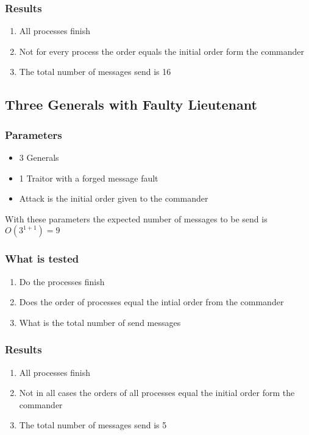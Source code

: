 \documentclass[a4paper, notitlepage]{article}
\begin{document}
\subsubsection*{Results}
\begin{enumerate}
\item All processes finish
\item Not for every process the order equals the initial order form the commander
\item The total number of messages send is 16
\end{enumerate}





\subsection{Three Generals with Faulty Lieutenant}

\subsubsection*{Parameters}
\begin{itemize}
\item 3 Generals
\item 1 Traitor with a forged message fault
\item Attack is the initial order given to the commander
\end{itemize}

With these parameters the expected number of messages to be send is \(O(3^{1+1}) = 9\)

\subsubsection*{What is tested}
\begin{enumerate}
\item Do the processes finish
\item Does the order of processes equal the intial order from the commander
\item What is the total number of send messages
\end{enumerate}

\subsubsection*{Results}
\begin{enumerate}
\item All processes finish
\item Not in all cases the orders of all processes equal the initial order form the commander
\item The total number of messages send is 5
\end{enumerate}
\end{document}
